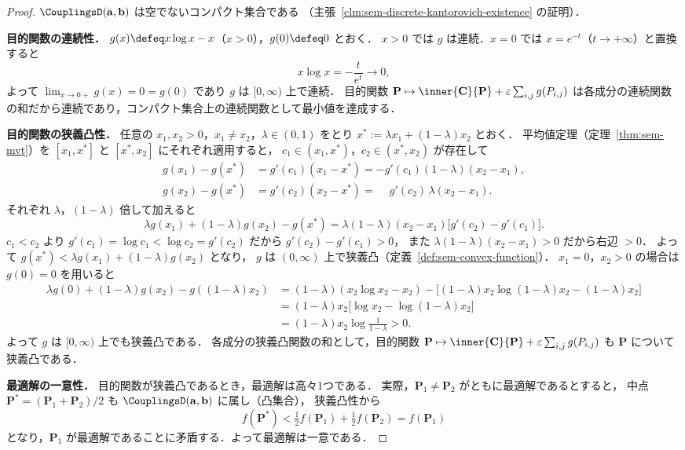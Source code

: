 \begin{proof}
  $\CouplingsD(\mathbf{a}, \mathbf{b})$ は空でないコンパクト集合である
  （主張~\ref{clm:sem-discrete-kantorovich-existence} の証明）．

  \textbf{目的関数の連続性．}
  $g(x) \defeq x\log x - x$（$x > 0$），$g(0) \defeq 0$ とおく．
  $x > 0$ では $g$ は連続．$x = 0$ では $x = e^{-t}$（$t \to +\infty$）と置換すると
  \[
    x\log x = -\frac{t}{e^t} \to 0,
  \]
  よって $\lim_{x\to 0+} g(x) = 0 = g(0)$ であり $g$ は $[0,\infty)$ 上で連続．
  目的関数 $\mathbf{P} \mapsto \inner{\mathbf{C}}{\mathbf{P}} + \varepsilon\sum_{i,j}g(P_{i,j})$
  は各成分の連続関数の和だから連続であり，コンパクト集合上の連続関数として最小値を達成する．

  \textbf{目的関数の狭義凸性．}
  任意の $x_1, x_2 > 0$，$x_1 \neq x_2$，$\lambda \in (0,1)$ をとり
  $x^* := \lambda x_1 + (1-\lambda)x_2$ とおく．
  平均値定理（定理~\ref{thm:sem-mvt}）を $[x_1, x^*]$ と $[x^*, x_2]$ にそれぞれ適用すると，
  $c_1 \in (x_1, x^*)$，$c_2 \in (x^*, x_2)$ が存在して
  \begin{align*}
    g(x_1) - g(x^*) &= g'(c_1)(x_1 - x^*)
                     = -g'(c_1)(1-\lambda)(x_2 - x_1), \\
    g(x_2) - g(x^*) &= g'(c_2)(x_2 - x^*)
                     = \phantom{-}g'(c_2)\,\lambda(x_2 - x_1).
  \end{align*}
  それぞれ $\lambda$，$(1-\lambda)$ 倍して加えると
  \[
    \lambda g(x_1) + (1-\lambda)g(x_2) - g(x^*)
    = \lambda(1-\lambda)(x_2 - x_1)\bigl[g'(c_2) - g'(c_1)\bigr].
  \]
  $c_1 < c_2$ より $g'(c_1) = \log c_1 < \log c_2 = g'(c_2)$ だから $g'(c_2) - g'(c_1) > 0$，
  また $\lambda(1-\lambda)(x_2-x_1) > 0$ だから右辺 $> 0$．
  よって $g(x^*) < \lambda g(x_1) + (1-\lambda)g(x_2)$ となり，
  $g$ は $(0,\infty)$ 上で狭義凸（定義~\ref{def:sem-convex-function}）．
  $x_1 = 0$，$x_2 > 0$ の場合は $g(0) = 0$ を用いると
  \begin{align*}
    \lambda g(0) + (1-\lambda)g(x_2) - g((1-\lambda)x_2)
    &= (1-\lambda)(x_2\log x_2 - x_2) - \bigl[(1-\lambda)x_2\log(1-\lambda)x_2 - (1-\lambda)x_2\bigr] \\
    &= (1-\lambda)x_2\bigl[\log x_2 - \log(1-\lambda)x_2\bigr] \\
    &= (1-\lambda)x_2\log\frac{1}{1-\lambda} > 0.
  \end{align*}
  よって $g$ は $[0,\infty)$ 上でも狭義凸である．
  各成分の狭義凸関数の和として，目的関数 $\mathbf{P} \mapsto \inner{\mathbf{C}}{\mathbf{P}} + \varepsilon\sum_{i,j}g(P_{i,j})$ も $\mathbf{P}$ について狭義凸である．

  \textbf{最適解の一意性．}
  目的関数が狭義凸であるとき，最適解は高々1つである．
  実際，$\mathbf{P}_1 \neq \mathbf{P}_2$ がともに最適解であるとすると，
  中点 $\mathbf{P}^* = (\mathbf{P}_1 + \mathbf{P}_2)/2$ も $\CouplingsD(\mathbf{a},\mathbf{b})$ に属し（凸集合），
  狭義凸性から
  \[
    f(\mathbf{P}^*) < \tfrac{1}{2}f(\mathbf{P}_1) + \tfrac{1}{2}f(\mathbf{P}_2) = f(\mathbf{P}_1)
  \]
  となり，$\mathbf{P}_1$ が最適解であることに矛盾する．よって最適解は一意である．
\end{proof}

